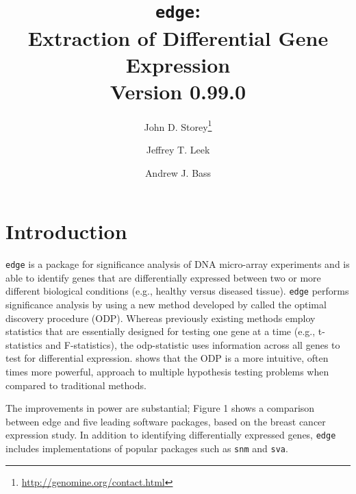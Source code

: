 \documentclass{article}
\begin{document}



\title{{\tt edge}:\\ Extraction of Differential Gene Expression \\ Version 0.99.0}

\author[1]{John D. Storey\thanks{\url{http://genomine.org/contact.html}}}
\author[2]{Jeffrey T. Leek}
\author[1]{Andrew J. Bass}

\renewcommand\Authands{ and }

\maketitle
\tableofcontents
\newpage
\section{Introduction}

{\tt edge} is a package for significance analysis of DNA micro-array experiments and is able to identify genes that are differentially expressed between two or more different biological conditions (e.g., healthy versus diseased tissue). {\tt edge} performs significance analysis by using a new method developed by \cite{storey:2007} called the optimal discovery procedure (ODP). Whereas previously existing methods employ statistics that are essentially designed for testing one gene at a time (e.g., t-statistics and F-statistics), the odp-statistic uses information across all genes to test for differential expression. \cite{storey:etal:2007} shows that the ODP is a more intuitive, often times more powerful, approach to multiple hypothesis testing problems when compared to traditional methods. 


The improvements in power are substantial; Figure 1 shows a comparison between edge and five leading software packages, based on the \cite{hedenfalk:2001} breast cancer expression study. In addition to identifying differentially expressed genes, {\tt edge} includes implementations of popular packages such as {\tt snm} and {\tt sva}.  
\end{document}
